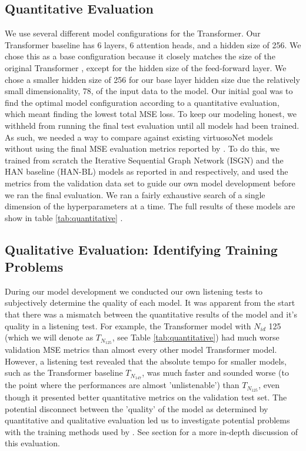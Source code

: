 \subsection{Quantitative Evaluation}
We use several different model configurations for the Transformer. Our Transformer baseline has 6 layers, 6 attention heads, and a hidden size of 256. We chose this as a base configuration because it closely matches the size of the original Transformer \cite{vaswani2017attention}, except for the hidden size of the feed-forward layer. We chose a smaller hidden size of 256 for our base layer hidden size due the relatively small dimensionality, 78, of the input data to the model. Our initial goal was to find the optimal model configuration according to a quantitative evaluation, which meant finding the lowest total MSE loss. To keep our modeling honest, we withheld from running the final test evaluation until all models had been trained. As such, we needed a way to compare against existing virtuosoNet models without using the final MSE evaluation metrics reported by \citet{jeong2019virtuosonet}. To do this, we trained from scratch the Iterative Sequential Graph Network (ISGN) and the HAN baseline (HAN-BL) models as reported in \cite{jeong2019graph} and \cite{jeong2019virtuosonet} respectively, and used the metrics from the validation data set to guide our own model development before we ran the final evaluation. We ran a fairly exhaustive search of a single dimension of the hyperparameters at a time. The full results of these models are show in table \ref{tab:quantitative} . 

\subsection{Qualitative Evaluation: Identifying Training Problems}\label{sec:qualitative-eval-problems}
During our model development we conducted our own listening tests to subjectively determine the quality of each model. It was apparent from the start that there was a mismatch between the quantitative results of the model and it's quality in a listening test. For example, the Transformer model with $N_{id}$ 125 (which we will denote as $T_{N_{125}}$, see Table \ref{tab:quantitative}) had much worse validation MSE metrics than almost every other model Transformer model. However, a listening test revealed that the absolute tempo for smaller models, such as the Transformer baseline $T_{N_{147}}$, was much faster and sounded worse (to the point where the performances are almost 'unlistenable') than $T_{N_{125}}$, even though it presented better quantitative metrics on the validation test set. The potential disconnect between the 'quality' of the model as determined by quantitative and qualitative evaluation led us to investigate potential problems with the training methods used by \citet{jeong2019virtuosonet}. See section  for a more in-depth discussion of this evaluation. 

